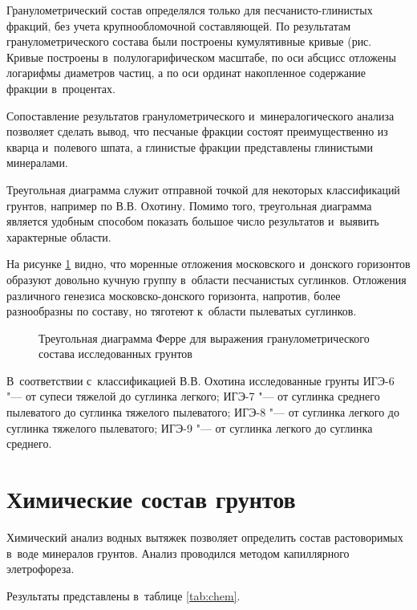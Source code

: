 Гранулометрический состав определялся только для песчанисто-глинистых фракций, без учета крупнообломочной составляющей.
По результатам гранулометрического состава были построены кумулятивные кривые (рис. %
Кривые построены в~полулогарифическом масштабе, 
по оси абсцисс отложены логарифмы диаметров частиц, 
а по оси ординат накопленное содержание фракции в~процентах.

{
\small

}

Сопоставление результатов гранулометрического и~минералогического анализа позволяет сделать вывод, 
что песчаные фракции состоят преимущественно из кварца и~полевого шпата, 
а глинистые фракции представлены глинистыми минералами.

Треугольная диаграмма служит отправной точкой для некоторых классификаций грунтов, например по В.\;В. Охотину.
Помимо того, треугольная диаграмма является удобным способом показать большое число результатов и~выявить характерные области.

На рисунке \ref{Fig:Ferre} видно, что моренные отложения московского и~донского горизонтов образуют довольно кучную группу в~области песчанистых суглинков.
Отложения различного генезиса московско-донского горизонта, напротив, более разнообразны по составу, но тяготеют к~области 
пылеватых суглинков.

\begin{figure}[ht]
    \centering
    \small
    
    \caption{Треугольная диаграмма Ферре для выражения гранулометрического состава исследованных грунтов}
    \label{Fig:Ferre}
\end{figure}

 В~соответствии с~классификацией В.\;В. Охотина исследованные грунты 
 ИГЭ-6 "--- от супеси тяжелой до суглинка легкого;
 ИГЭ-7 "--- от суглинка среднего пылеватого до суглинка тяжелого пылеватого;
 ИГЭ-8 "--- от суглинка легкого до суглинка тяжелого пылеватого;
 ИГЭ-9 "--- от суглинка легкого до суглинка среднего.

 
\section{Химические состав грунтов}

Химический анализ водных вытяжек позволяет определить состав растоворимых в~воде минералов грунтов.
Анализ проводился методом капиллярного элетрофореза. 

Результаты представлены в~таблице \ref{tab:chem}.

